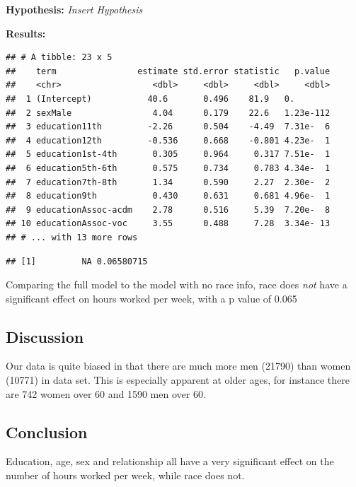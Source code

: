 \documentclass[]{article}
\newenvironment{Shaded}{\begin{snugshade}}{\end{snugshade}}
\newcommand{\KeywordTok}[1]{\textcolor[rgb]{0.13,0.29,0.53}{\textbf{#1}}}
\newcommand{\NormalTok}[1]{#1}
\newcommand{\OperatorTok}[1]{\textcolor[rgb]{0.81,0.36,0.00}{\textbf{#1}}}
\begin{document}
\textbf{Hypothesis:} \emph{Insert Hypothesis}

\textbf{Results:}

\begin{verbatim}
## # A tibble: 23 x 5
##    term                estimate std.error statistic   p.value
##    <chr>                  <dbl>     <dbl>     <dbl>     <dbl>
##  1 (Intercept)           40.6       0.496    81.9   0.       
##  2 sexMale                4.04      0.179    22.6   1.23e-112
##  3 education11th         -2.26      0.504    -4.49  7.31e-  6
##  4 education12th         -0.536     0.668    -0.801 4.23e-  1
##  5 education1st-4th       0.305     0.964     0.317 7.51e-  1
##  6 education5th-6th       0.575     0.734     0.783 4.34e-  1
##  7 education7th-8th       1.34      0.590     2.27  2.30e-  2
##  8 education9th           0.430     0.631     0.681 4.96e-  1
##  9 educationAssoc-acdm    2.78      0.516     5.39  7.20e-  8
## 10 educationAssoc-voc     3.55      0.488     7.28  3.34e- 13
## # ... with 13 more rows
\end{verbatim}

\begin{Shaded}
\end{Shaded}

\begin{verbatim}
## [1]         NA 0.06580715
\end{verbatim}

Comparing the full model to the model with no race info, race does
\emph{not} have a significant effect on hours worked per week, with a p
value of 0.065

\hypertarget{discussion}{%
\subsection{Discussion}\label{discussion}}

Our data is quite biased in that there are much more men (21790) than
women (10771) in data set. This is especially apparent at older ages,
for instance there are 742 women over 60 and 1590 men over 60.

\hypertarget{conclusion}{%
\subsection{Conclusion}\label{conclusion}}

Education, age, sex and relationship all have a very significant effect
on the number of hours worked per week, while race does not.
\end{document}
